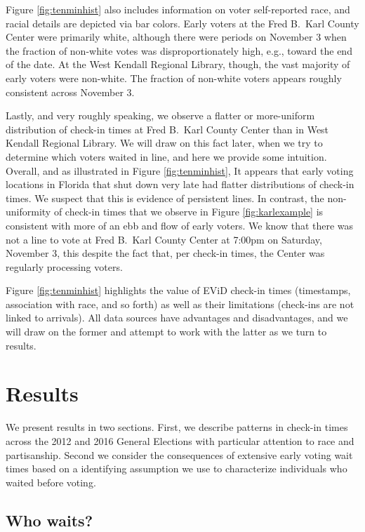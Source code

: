 \documentclass[12pt,titlepage]{article}
\begin{document}
Figure \ref{fig:tenminhist} also includes information on voter
self-reported race, and racial details are depicted via bar colors.
Early voters at the Fred B.\ Karl County Center were primarily white,
although there were periods on November 3 when the fraction of
non-white votes was disproportionately high, e.g., toward the end of
the date.  At the West Kendall Regional Library, though, the vast
majority of early voters were non-white.  The fraction of non-white
voters appears roughly consistent across November 3.

Lastly, and very roughly speaking, we observe a flatter or
more-uniform distribution of check-in times at Fred B.\ Karl County
Center than in West Kendall Regional Library.  We will draw on this
fact later, when we try to determine which voters waited in line, and
here we provide some intuition.  Overall, and as illustrated in Figure
\ref{fig:tenminhist}, It appears that early voting locations in
Florida that shut down very late had flatter distributions of check-in
times.  We suspect that this is evidence of persistent lines.  In
contrast, the non-uniformity of check-in times that we observe in
Figure \ref{fig:karlexample} is consistent with more of an ebb and
flow of early voters.  We know that there was not a line to vote at
Fred B.\ Karl County Center at 7:00pm on Saturday, November 3, this
despite the fact that, per check-in times, the Center was regularly
processing voters.

Figure \ref{fig:tenminhist} highlights the value of EViD check-in
times (timestamps, association with race, and so forth) as well as
their limitations (check-ins are not linked to arrivals).  All data
sources have advantages and disadvantages, and we will draw on the
former and attempt to work with the latter as we turn to results.

\section*{Results}

We present results in two sections.  First, we describe patterns in
check-in times across the 2012 and 2016 General Elections with
particular attention to race and partisanship.  Second we consider the
consequences of extensive early voting wait times based on a
identifying assumption we use to characterize individuals who waited
before voting.

\subsection*{Who waits?}
\end{document}
